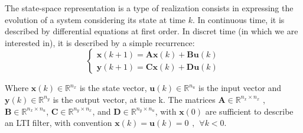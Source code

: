 %
%
%
%
	\vspace{10pt}
	The state-space representation is a type of realization consists in expressing the evolution of a system considering its state at time $k$. In
	continuous time, it is described by differential equations at first order. In discret time (in which we
	are interested in), it is described by a simple recurrence:
	\begin{equation} \label{abcddef}
		\begin{cases}
			\boldsymbol{x}(k+1)= \boldsymbol{Ax}(k) + \boldsymbol{Bu}(k) \\
			\boldsymbol{y}(k+1)= \boldsymbol{Cx}(k) + \boldsymbol{Du}(k)
		\end{cases}
	\end{equation}

	Where $\boldsymbol{x}(k) \in \mathbb{R}^{n_x}$ is the state vector,
	$\boldsymbol{u}(k) \in \mathbb{R}^{n_u}$ is the input vector and
	$\boldsymbol{y}(k) \in \mathbb{R}^{n_y}$ is the output vector, at time k.
	The matrices $\boldsymbol{A} \in \mathbb{R}^{n_x \times n_x}$ , $\boldsymbol{B} \in \mathbb{R}^{n_x \times n_u}$,
	$\boldsymbol{C} \in \mathbb{R}^{n_y \times n_x}$, and $\boldsymbol{D} \in \mathbb{R}^{n_y \times n_u}$,
	with $\boldsymbol{x}(0)$ are sufficient to describe an LTI filter, with convention $\boldsymbol{x}(k)=\boldsymbol{u}(k)=0 \hspace{5pt}, \hspace{5pt} \forall k<0$.

